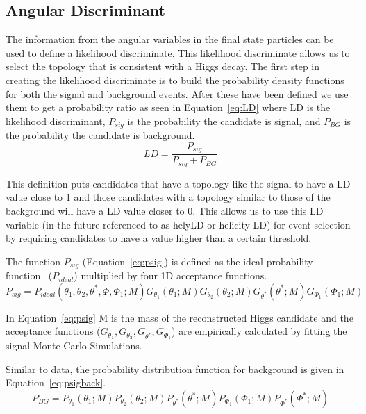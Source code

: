 \subsection{Angular Discriminant}

The information from the angular variables in the final state particles can be used to define a likelihood discriminate.  This likelihood discriminate allows us to select the topology that is consistent with a Higgs decay.  The first step in creating the likelihood discriminate is to build the probability density functions  for both the signal and background events.  After these have been defined we use them to get a probability ratio as seen in Equation~\ref{eq:LD} where LD is the likelihood discriminant, $P_{sig}$ is the probability the candidate is signal, and $P_{BG}$ is the probability the candidate is background.
  \begin{equation} LD = \dfrac{P_{sig}}{P_{sig}+P_{BG}} \label{eq:LD}\end{equation}

This definition puts candidates that have a topology like the signal to have a LD value close to 1 and those candidates with a topology similar to those of the background will have a LD value closer to 0.  This allows us to use this LD variable (in the future referenced to as helyLD or helicity LD) for event selection by requiring candidates to have a value higher than a certain threshold.

The function $P_{sig}$ (Equation~\ref{eq:psig}) is defined as the ideal probability function~\cite{PhysRevD.81.075022} ($P_{ideal}$) multiplied by four 1D acceptance functions.  
\begin{equation} P_{sig} = P_{ideal}(\theta_1, \theta_2, \theta^*, \Phi, \Phi_1 ;M)G_{\theta_1}(\theta_1;M)G_{\theta_2}(\theta_2;M)G_{\theta^*}(\theta^*;M)G_{\Phi_1}(\Phi_1;M) \label{eq:psig}\end{equation}

In Equation~\ref{eq:psig} M is the mass of the reconstructed Higgs candidate and the acceptance functions ($G_{\theta_1},G_{\theta_2},G_{\theta^*},G_{\Phi_1}$) are empirically calculated by fitting the signal Monte Carlo Simulations.

Similar to data, the probability distribution function for background is given in Equation~\ref{eq:psigback}.
\begin{equation} P_{BG} = P_{\theta_1}(\theta_1;M)P_{\theta_2}(\theta_2;M)P_{\theta^*}(\theta^*;M)P_{\Phi_1}(\Phi_1;M)P_{\Phi^*}(\Phi^*;M) \label{eq:psigback}\end{equation}

